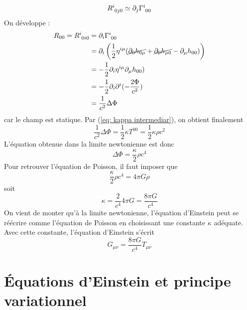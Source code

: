 \begin{equation}
    R\indices{^{i}_{0j0}} \simeq \partial_{j}\Gamma\indices{^{i}_{00}}
\end{equation}
On développe : 
\begin{align}
    R_{00}= R\indices{^{i}_{0i0}} &= \partial_{i}\Gamma\indices{^{i}_{00}}\\
    &= \partial_{i}\left(\frac{1}{2}\eta^{i \mu}(\cancel{\partial_{0}h_{0 \mu}} + \cancel{\partial_{0}h_{\mu 0}} - \partial_{\mu}h_{00})\right)\\
    &= -\frac{1}{2}\partial_{i}\eta^{i \mu}\partial_{\mu}h_{00})\\
    & = -\frac{1}{2}\pd_i \pd^i(-\frac{2 \Phi}{c^2})\\
    & = \frac{1}{c^2}\Delta\Phi
\end{align}
car le champ est statique. Par (\ref{eq: kappa intermediar}), on obtient finalement
\begin{equation}
    \frac{1}{c^2}\Delta\Phi = \frac{1}{2}\kappa T^{00} = \frac{1}{2}\kappa \rho c^2
\end{equation}
L'équation obtenue dans la limite newtonienne est donc
\begin{equation}
    \Delta\Phi =  \frac{\kappa}{2} \rho c^4
\end{equation}
Pour retrouver l'équation de Poisson, il faut imposer que
 \begin{equation}
      \frac{\kappa}{2} \rho c^4 = 4 \pi G\rho
 \end{equation}
soit
\begin{equation}
    \kappa = \frac{2}{c^4}4\pi G = \frac{8 \pi G}{c^4}
\end{equation}
On vient de monter qu'à la limite newtonienne, l'équation d'Einstein peut se réécrire comme l'équation de Poisson en choisissant une constante $\kappa$ adéquate. Avec cette constante, l'équation d'Einstein s'écrit
\begin{equation}
    G_{\mu \nu} = \frac{8 \pi G}{c^4}T_{\mu \nu}
\end{equation}


\section{Équations d'Einstein et principe variationnel}
